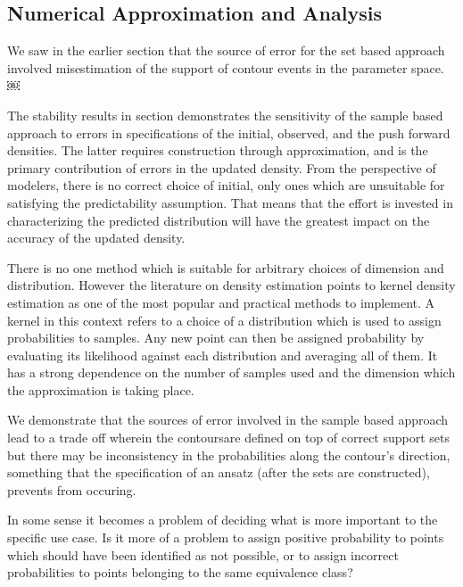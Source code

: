 \subsection{Numerical Approximation and Analysis}\label{sec:sample-approx}

We saw in the earlier section that the source of error for the set based approach involved misestimation of the support of contour events in the parameter space. ￼

The stability results in section demonstrates the sensitivity of the sample based approach to errors in specifications of the initial, observed, and the push forward densities.
The latter requires construction through approximation, and is the primary contribution of errors in the updated density.
From the perspective of modelers, there is no correct choice of initial, only ones which are unsuitable for satisfying the predictability assumption.
That means that the effort is invested in characterizing the predicted distribution will have the greatest impact on the accuracy of the updated density.

There is no one method which is suitable for arbitrary choices of dimension and distribution.
However the literature on density estimation points to kernel density estimation as one of the most popular and practical methods to implement.
A kernel in this context refers to a choice of a distribution which is used to assign probabilities to samples.
Any new point can then be assigned probability by evaluating its likelihood against each distribution and averaging all of them.
It has a strong dependence on the number of samples used and the dimension which the approximation is taking place.

We demonstrate that the sources of error involved in the sample based approach lead to a trade off wherein the contoursare defined on top of correct support sets but there may be inconsistency in the probabilities along the contour's direction, something that the specification of an ansatz (after the sets are constructed), prevents from occuring.

In some sense it becomes a problem of deciding what is more important to the specific use case.
Is it more of a problem to assign positive probability to points which should have been identified as not possible, or to assign incorrect probabilities to points belonging to the same equivalence class?


